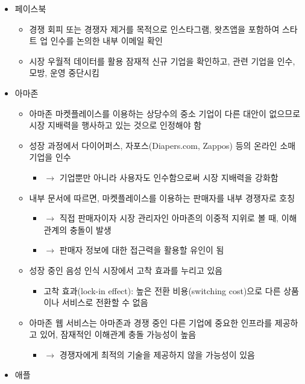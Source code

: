 \begin{itemize}
\item 페이스북 \citep{Subcommittee-on-Antitrust-Commercial-and-Administrative-Law:2020aa}
	\begin{itemize}
  \item 경쟁 회피 또는 경쟁자 제거를 목적으로 인스타그램, 왓츠앱을 포함하여 스타트 업 인수를 논의한 내부 이메일 확인
  \item 시장 우월적 데이터를 활용 잠재적 신규 기업을 확인하고, 관련 기업을 인수, 모방, 운영 중단시킴
	\end{itemize}	
\item 아마존
	\begin{itemize}
	\item 아마존 마켓플레이스를 이용하는 상당수의 중소 기업이 다른 대안이 없으므로 시장 지배력을 행사하고 있는 것으로 인정해야 함
  \item 성장 과정에서 다이어퍼스, 자포스(Diapers.com, Zappos) 등의 온라인 소매 기업을 인수
	\begin{itemize}
	\item $\rightarrow$ 기업뿐만 아니라 사용자도 인수함으로써 시장 지배력을 강화함
	\end{itemize}
  \item 내부 문서에 따르면, 마켓플레이스를 이용하는 판매자를 내부 경쟁자로 호칭
	\begin{itemize}
	\item $\rightarrow$ 직접 판매자이자 시장 관리자인 아마존의 이중적 지위로 볼 때, 이해관계의 충돌이 발생 
	\item $\rightarrow$ 판매자 정보에 대한 접근력을 활용할 유인이 됨
	\end{itemize}
  \item 성장 중인 음성 인식 시장에서 고착 효과를 누리고 있음
		\begin{itemize}
		\item 고착 효과(lock-in effect): 높은 전환 비용(switching cost)으로 다른 상품이나 서비스로 전환할 수 없음
		\end{itemize}
	\item 아마존 웹 서비스는 아마존과 경쟁 중인 다른 기업에 중요한 인프라를 제공하고 있어, 잠재적인 이해관계 충돌 가능성이 높음
		\begin{itemize}
		\item $\rightarrow$ 경쟁자에게 최적의 기술을 제공하지 않을 가능성이 있음
		\end{itemize}
	\end{itemize}	
\item 애플
	\begin{itemize}

\end{itemize}
\end{itemize}
